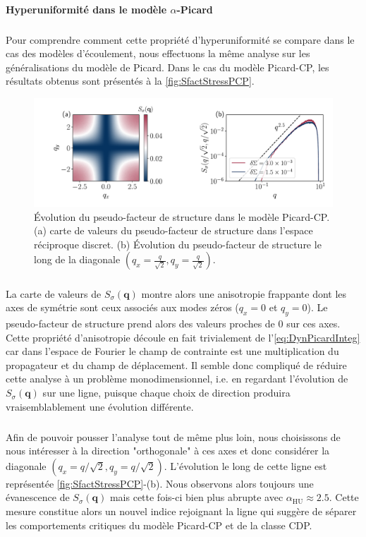 \paragraph{Hyperuniformité dans le modèle $\alpha$-Picard}

\subparagraph{}Pour comprendre comment cette propriété d'hyperuniformité se compare dans le cas des modèles d'écoulement, nous effectuons la même analyse sur les généralisations du modèle de Picard. Dans le cas du modèle Picard-CP, les résultats obtenus sont présentés à la \autoref{fig:SfactStressPCP}.

\begin{figure}[h]
	\centering
	\includegraphics[width=\textwidth]{Chapitre4/Figures/Correlations/Sfact_SRP.pdf}
	\caption{Évolution du pseudo-facteur de structure dans le modèle Picard-CP. (a) carte de valeurs du pseudo-facteur de structure dans l'espace réciproque discret. (b) Évolution du pseudo-facteur de structure le long de la diagonale $(q_x=\frac{q}{\sqrt{2}},q_y=\frac{q}{\sqrt{2}})$.}
	\label{fig:SfactStressPCP}
\end{figure}

\subparagraph{}La carte de valeurs de $S_\sigma(\mathbf{q})$ montre alors une anisotropie frappante dont les axes de symétrie sont ceux associés aux modes zéros ($q_x=0$ et $q_y=0$). Le pseudo-facteur de structure prend alors des valeurs proches de 0 sur ces axes. Cette propriété d'anisotropie découle en fait trivialement de l'\autoref{eq:DynPicardInteg} car dans l'espace de Fourier le champ de contrainte est une multiplication du propagateur et du champ de déplacement. Il semble donc compliqué de réduire cette analyse à un problème monodimensionnel, i.e. en regardant l'évolution de $S_\sigma(\mathbf{q})$ sur une ligne, puisque chaque choix de direction produira vraisemblablement une évolution différente.

\subparagraph{}Afin de pouvoir pousser l'analyse tout de même plus loin, nous choisissons de nous intéresser à la direction "orthogonale" à ces axes et donc considérer la diagonale $(q_x = q/\sqrt{2}, q_y = q/\sqrt{2})$. L'évolution le long de cette ligne est représentée \autoref{fig:SfactStressPCP}-(b). Nous observons alors toujours une évanescence de $S_\sigma(\mathbf{q})$ mais cette fois-ci bien plus abrupte avec $\alpha_\text{HU} \approx 2.5$. Cette mesure constitue alors un nouvel indice rejoignant la ligne qui suggère de séparer les comportements critiques du modèle Picard-CP et de la classe CDP.

